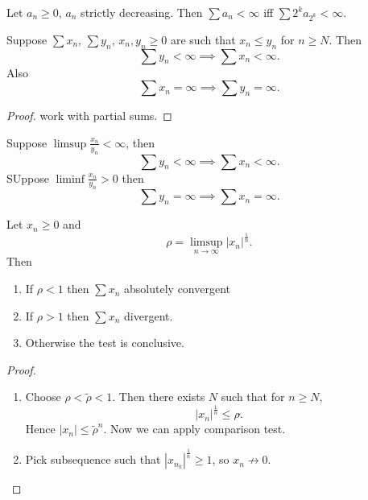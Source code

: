 \begin{theorem}
	Let $a_n \ge 0$, $a_n$ strictly decreasing. Then $\sum a_n <\infty $ iff $\sum 2^k a_{2^k} < \infty $.
	
\end{theorem}

\begin{theorem}
	Suppose $\sum x_n$, $\sum y_n$, $x_n, y_n \ge 0$ are such that  $x_n \le y_n$ for $n \ge N$. Then 
	\[
	\sum y_n < \infty \implies \sum x_n < \infty 
	.\] 
	Also
	\[
		\sum x_n = \infty  \implies \sum y_n = \infty
	.\] 
\end{theorem}
\begin{proof}
	work with partial sums.
\end{proof}


\begin{theorem}
	Suppose $\limsup \frac{x_n}{y_n}< \infty$, then
	\[
		\sum y_n <\infty  \implies \sum x_n < \infty
	.\] 
	SUppose $\liminf \frac{x_n}{y_n}>0$ then
	\[
		\sum y_n = \infty  \implies \sum x_n = \infty 
	.\] 
\end{theorem}
\begin{theorem}
	Let $x_n \ge 0$ and 
	\[
		\rho =\limsup _{n \to  \infty } |x_n|^{\frac{1}{n}}
	.\] 
	Then
	\begin{enumerate}
		\item If $\rho < 1$ then $\sum x_n $ absolutely convergent
		\item If  $\rho > 1$ then $\sum x_n$ divergent.
		\item Otherwise the test is conclusive.
	\end{enumerate}
\end{theorem}
\begin{proof}
	\begin{enumerate}
		\item Choose $\rho < \tilde \rho < 1$. Then there exists $N $ such that for $n \ge N$,
	\[
		|x_n|^{\frac{1}{n}}\le \rho \tilde
	.\] 
	Hence $|x_n|\le \tilde \rho^n$. Now we can apply comparison test.
\item Pick subsequence such that $|x_{n_k}|^{\frac{1}{n}} \ge 1$, so $x_n \not \to 0$.
	\end{enumerate}
\end{proof}

